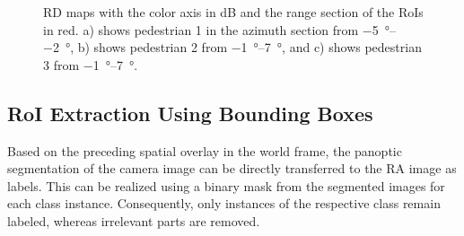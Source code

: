 \documentclass[conference]{IEEEtran}
\begin{document}
\begin{figure}
    \centering
    \begin{subfigure}{8.8cm}
		\begin{minipage}[l]{0.1cm}
			\caption{}
		\end{minipage}
		\hfill
		\begin{minipage}[r]{8.1cm}
            \hspace{-0.3cm}
			
		\end{minipage}
	\end{subfigure}
     \begin{subfigure}{8.8cm}
		\begin{minipage}[l]{0.1cm}
			\caption{}
		\end{minipage}
		\hfill
		\begin{minipage}[r]{8.1cm}
            \hspace{-0.3cm}
			
		\end{minipage}
	\end{subfigure}

    \begin{subfigure}{8.8cm}
		\begin{minipage}[l]{0.1cm}
			\caption{}
		\end{minipage}
		\hfill
		\begin{minipage}[r]{8.1cm}
            \hspace{-0.3cm}
			
		\end{minipage}
	\end{subfigure}
    \vspace{-0.2cm}
\caption{RD maps with the color axis in dB and the range section of the RoIs in red. a) shows pedestrian 1 in the azimuth section from \qtyrange{-5}{-2}{\degree}, b) shows pedestrian 2 from \qtyrange{-1}{7}{\degree}, and c) shows pedestrian 3 from \qtyrange{-1}{7}{\degree}.}
\label{fig:rd_roi}
\end{figure}
%
%
\subsection{RoI Extraction Using Bounding Boxes}

Based on the preceding spatial overlay in the world frame, the panoptic segmentation of the camera image can be directly transferred to the RA image as labels.
This can be realized using a binary mask from the segmented images for each class instance.
Consequently, only instances of the respective class remain labeled, whereas irrelevant parts are removed.
\end{document}
